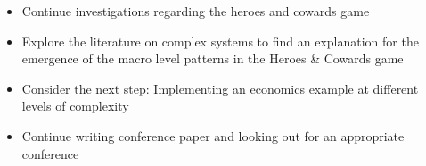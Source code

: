 \begin{itemize}
\item Continue investigations regarding the heroes and cowards game
\item Explore the literature on complex systems to find an explanation for the emergence of the macro level patterns in the Heroes \& Cowards game
\item Consider the next step: Implementing an economics example at different levels of complexity 
\item Continue writing conference paper and looking out for an appropriate conference
\end{itemize} 
